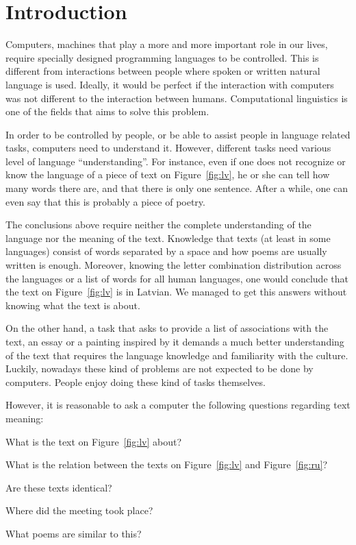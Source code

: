 \chapter{Introduction}
\label{ch:introduction}

Computers, machines that play a more and more important role in our lives,
require specially designed programming languages to be controlled. This is
different from interactions between people where spoken or written natural
language is used. Ideally, it would be perfect if the interaction with computers
was not different to the interaction between humans. Computational linguistics is
one of the fields that aims to solve this problem.

In order to be controlled by people, or be able to assist people in language
related tasks, computers need to understand it. However, different tasks need
various level of language ``understanding''. For instance, even if one does not
recognize or know the language of a piece of text on Figure~\ref{fig:lv}, he or
she can tell how many words there are, and that there is only one
sentence. After a while, one can even say that this is probably a piece of
poetry.

The conclusions above require neither the complete understanding of the language nor the
meaning of the text. Knowledge that texts (at least in some languages) consist
of words separated by a space and how poems are usually written is
enough. Moreover, knowing the letter combination distribution across the
languages or a list of words for all human languages, one would conclude that
the text on Figure~\ref{fig:lv} is in Latvian. We managed to get this answers
without knowing what the text is about.



On the other hand, a task that asks to provide a list of associations with the text, an essay or a painting inspired by it demands a much better understanding of the text that requires the language knowledge and familiarity with the culture. Luckily, nowadays these kind of problems are not expected to be done by computers. People enjoy doing these kind of tasks themselves.

However, it is reasonable to ask a computer the following questions regarding text meaning:
\begin{inparaenum}[a)]
\item What is the text on Figure~\ref{fig:lv} about?
\item What is the relation between the texts on Figure~\ref{fig:lv} and
  Figure~\ref{fig:ru}?
\item Are these texts identical?
\item Where did the meeting took place?
\item What poems are similar to this?
\end{inparaenum}

